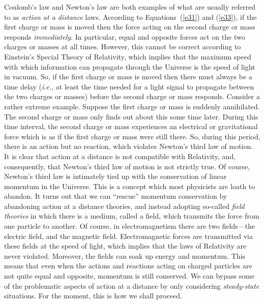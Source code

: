 Coulomb's law and Newton's law are both examples of what are usually referred to as
{\em action at a distance}\/ laws.
  According to Equations~(\ref{e31}) and (\ref{e33}), if the first charge
or mass is moved then the force acting on the second charge or mass 
responds {\em immediately}. In particular, equal and opposite forces act on the two charges or masses
at all times. However, this cannot be correct according to Einstein's Special Theory of
Relativity, which implies that the maximum speed with which information can propagate through
 the Universe
is the speed of light in vacuum. So, if the first charge or mass is moved then there must
always be a time delay ({\em i.e.}, at least the time needed for a light
signal to propagate between the two charges or masses) before the second charge or
mass responds. Consider a rather extreme example. Suppose the first charge or
mass is suddenly annihilated. The second charge or mass only finds out about
this some time later. During this time interval, the second charge or mass
experiences an electrical or gravitational force  which is as if 
the first charge or mass were still there.
 So, during this period, there is an action but no
reaction, which violates Newton's third law of motion.
 It is clear that action at a distance
is not compatible with Relativity, and, consequently,
that Newton's third law of motion is 
 not
strictly true. Of course, Newton's third law is intimately tied up with the
conservation of linear momentum in the Universe. This is a concept which most physicists are loath
to abandon.  It turns out that we can ``rescue'' momentum conservation by abandoning
action at a distance theories, and instead adopting so-called  {\em field theories}\/ in which
there is a medium, called a field, which transmits the force from one particle
to another. Of course, in electromagnetism there are two fields---the electric field,
and the magnetic field. Electromagnetic forces are transmitted via these 
fields at the speed of light, which implies that the laws
of Relativity are  never violated.
Moreover, the fields can soak up energy and  momentum. This means that even when
the actions and reactions acting on charged particles are not quite equal and opposite,
momentum is still conserved. 
We can bypass some of the problematic aspects of  action at a distance by
only considering {\em steady-state}\/ situations. For the moment, this is how we shall
proceed.


